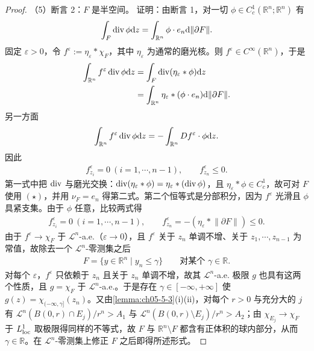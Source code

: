 \documentclass[../../main.tex]{subfiles}%
\begin{document}
\begin{proof}
（5）断言 2：$F$ 是半空间。
证明：由断言 1，对一切 $\phi\in C_c^1(\mathbb{R}^n;\mathbb{R}^n)$ 有
\begin{align*}
\int_F\operatorname{div}\phi\mathrm{d} z=\int_{\mathbb{R}^n}\phi\cdot e_n\mathrm{d}\lVert\partial F\rVert .
\end{align*}
固定 $\varepsilon>0$，令 $f^{\varepsilon}:=\eta_{\varepsilon}*\chi_F$，其中 $\eta_{\varepsilon}$ 为通常的磨光核。则 $f^{\varepsilon}\in C^{\infty}(\mathbb{R}^n)$，于是
\begin{align*}
\int_{\mathbb{R}^n}f^{\varepsilon}\operatorname{div}\phi\mathrm{d} z
&=\int_F\operatorname{div}(\eta_{\varepsilon}*\phi)\mathrm{d} z\\
&=\int_{\mathbb{R}^n}\eta_{\varepsilon}*(\phi\cdot e_n)\mathrm{d}\lVert\partial F\rVert .
\end{align*}
另一方面
\begin{align*}
\int_{\mathbb{R}^n}f^{\varepsilon}\operatorname{div}\phi\mathrm{d} z=-\int_{\mathbb{R}^n}Df^{\varepsilon}\cdot\phi\mathrm{d} z .
\end{align*}
因此
\begin{align*}
f^{\varepsilon}_{z_i}=0\ (i=1,\cdots,n-1),\qquad f^{\varepsilon}_{z_n}\leqslant0 .
\end{align*}
第一式中把 $\operatorname{div}$ 与磨光交换：$\operatorname{div}(\eta_{\varepsilon}*\phi)=\eta_{\varepsilon}*(\operatorname{div}\phi)$，且 $\eta_{\varepsilon}*\phi\in C_c^1$，故可对 $F$ 使用 $(\star)$，并用 $\nu_F=e_n$ 得第二式。第二个恒等式是分部积分，因为 $f^{\varepsilon}$ 光滑且 $\phi$ 具紧支集。由于 $\phi$ 任意，比较两式得
\begin{align*}
f^{\varepsilon}_{z_i}=0\ (i=1,\cdots,n-1),\qquad f^{\varepsilon}_{z_n}=-(\eta_{\varepsilon}*\lVert\partial F\rVert)\leqslant0 .
\end{align*}
由于 $f^{\varepsilon}\to\chi_F$ 于 $\mathcal{L}^n$-a.e.（$\varepsilon\to0$），且 $f^{\varepsilon}$ 关于 $z_n$ 单调不增、关于 $z_1,\cdots,z_{n-1}$ 为常值，故除去一个 $\mathcal{L}^n$-零测集之后
\begin{align*}
F=\{y\in\mathbb{R}^n\mid y_n\leqslant\gamma\}\qquad\text{对某个 }\gamma\in\mathbb{R}.
\end{align*}
对每个 $\varepsilon$，$f^{\varepsilon}$ 只依赖于 $z_n$ 且关于 $z_n$ 单调不增，故其 $\mathcal{L}^n$-a.e. 极限 $g$ 也具有这两个性质，且 $g=\chi_F$ 于 $\mathcal{L}^n$-a.e.。于是存在 $\gamma\in[-\infty,+\infty]$ 使 $g(z)=\chi_{(-\infty,\gamma]}(z_n)$。又由\cref{lemma:ch05-5-3}(i)(ii)，对每个 $r>0$ 与充分大的 $j$ 有 $\mathcal{L}^n(B(0,r)\cap E_j)/r^n> A_1$ 与 $\mathcal{L}^n(B(0,r)\setminus E_j)/r^n>A_2$；由 $\chi_{E_j}\to\chi_F$ 于 $L^1_{\mathrm{loc}}$ 取极限得同样的不等式，故 $F$ 与 $\mathbb{R}^n\setminus F$ 都含有正体积的球内部分，从而 $\gamma\in\mathbb{R}$。在 $\mathcal{L}^n$-零测集上修正 $F$ 之后即得所述形式。%


\end{proof}
\end{document}
